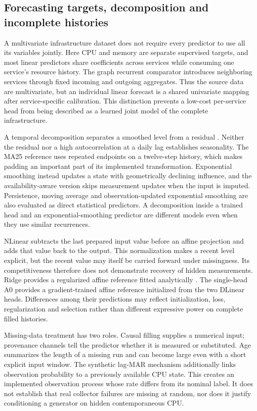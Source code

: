 \subsection{Forecasting targets, decomposition and incomplete histories}
A multivariate infrastructure dataset does not require every predictor to use all its variables jointly. Here CPU and memory are separate supervised targets, and most linear predictors share coefficients across services while consuming one service's resource history. The graph recurrent comparator introduces neighboring services through fixed incoming and outgoing aggregates. Thus the source data are multivariate, but an individual linear forecast is a shared univariate mapping after service-specific calibration. This distinction prevents a low-cost per-service head from being described as a learned joint model of the complete infrastructure.

A temporal decomposition separates a smoothed level from a residual \cite{hyndmanfpp3}. Neither the residual nor a high autocorrelation at a daily lag establishes seasonality. The MA25 reference uses repeated endpoints on a twelve-step history, which makes padding an important part of its implemented transformation. Exponential smoothing instead updates a state with geometrically declining influence, and the availability-aware version skips measurement updates when the input is imputed. Persistence, moving average and observation-updated exponential smoothing are also evaluated as direct statistical predictors. A decomposition inside a trained head and an exponential-smoothing predictor are different models even when they use similar recurrences.

NLinear subtracts the last prepared input value before an affine projection and adds that value back to the output. This normalization makes a recent level explicit, but the recent value may itself be carried forward under missingness. Its competitiveness therefore does not demonstrate recovery of hidden measurements. Ridge provides a regularized affine reference fitted analytically \cite{hoerlkennard}. The single-head A0 provides a gradient-trained affine reference initialized from the two DLinear heads. Differences among their predictions may reflect initialization, loss, regularization and selection rather than different expressive power on complete filled histories.

Missing-data treatment has two roles. Causal filling supplies a numerical input; provenance channels tell the predictor whether it is measured or substituted. Age summarizes the length of a missing run and can become large even with a short explicit input window. The synthetic lag-MAR mechanism additionally links observation probability to a previously available CPU state. This creates an implemented observation process whose rate differs from its nominal label. It does not establish that real collector failures are missing at random, nor does it justify conditioning a generator on hidden contemporaneous CPU.

